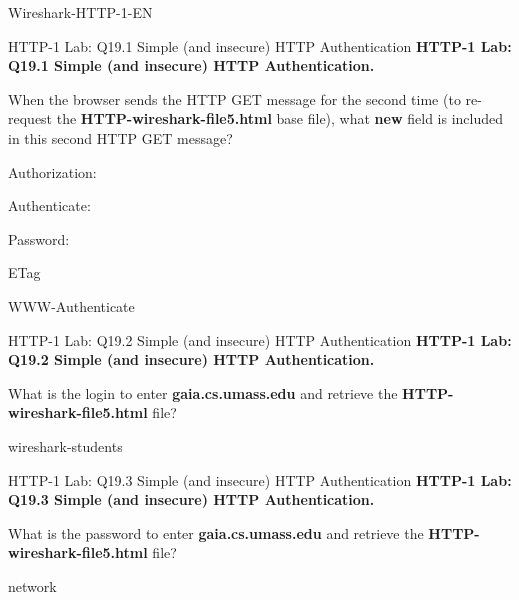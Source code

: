 \documentclass[a4paper]{article}
\begin{document}
\begin{quiz}{Wireshark-HTTP-1-EN}
\begin{multi}[points=1,shuffle]{HTTP-1 Lab: Q19.1 Simple (and insecure) HTTP Authentication}
\textbf{HTTP-1 Lab: Q19.1 Simple (and insecure) HTTP Authentication.} 

When the browser sends the HTTP GET message for the second time (to re-request the \textbf{HTTP-wireshark-file5.html} base file), what \textbf{new} field is included in this second HTTP GET message?   
\item* Authorization:
\item Authenticate:
\item Password:
\item ETag
\item WWW-Authenticate
\end{multi}

\begin{shortanswer}[points=1]{HTTP-1 Lab: Q19.2 Simple (and insecure) HTTP Authentication}
\textbf{HTTP-1 Lab: Q19.2 Simple (and insecure) HTTP Authentication.} 

What is the login to enter \textbf{gaia.cs.umass.edu} and retrieve the \textbf{HTTP-wireshark-file5.html} file?
\item wireshark-students
\end{shortanswer}

\begin{shortanswer}[points=1,shuffle]{HTTP-1 Lab: Q19.3 Simple (and insecure) HTTP Authentication}
\textbf{HTTP-1 Lab: Q19.3 Simple (and insecure) HTTP Authentication.} 

What is the password to enter \textbf{gaia.cs.umass.edu} and retrieve the \textbf{HTTP-wireshark-file5.html} file?
\item network
\end{shortanswer}

\end{quiz}
\end{document}

